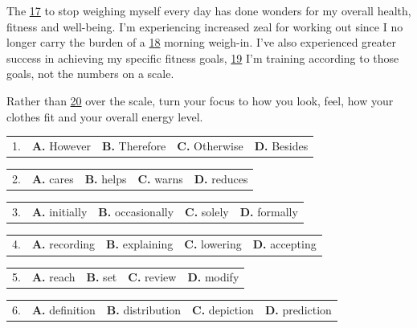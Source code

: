 \documentclass[UTF8,11pt]{ctexart}
\begin{document}
The \uline{17} to stop weighing myself every day has done wonders for my overall health, fitness and well-being. I'm experiencing increased zeal for working out since I no longer carry the burden of a \uline{18} morning weigh-in. I've also experienced greater success in achieving my specific fitness goals, \uline{19} I'm training according to those goals, not the numbers on a scale.


Rather than \uline{20} over the scale, turn your focus to how you look, feel, how your clothes fit and your overall energy level.


\noindent\begin{tabularx}{\linewidth}{@{}lXXXX@{}}1. & \textbf{A.} However & \textbf{B.} Therefore & \textbf{C.} Otherwise & \textbf{D.} Besides\\\end{tabularx}\par

\noindent\begin{tabularx}{\linewidth}{@{}lXXXX@{}}2. & \textbf{A.} cares & \textbf{B.} helps & \textbf{C.} warns & \textbf{D.} reduces\\\end{tabularx}\par

\noindent\begin{tabularx}{\linewidth}{@{}lXXXX@{}}3. & \textbf{A.} initially & \textbf{B.} occasionally & \textbf{C.} solely & \textbf{D.} formally\\\end{tabularx}\par

\noindent\begin{tabularx}{\linewidth}{@{}lXXXX@{}}4. & \textbf{A.} recording & \textbf{B.} explaining & \textbf{C.} lowering & \textbf{D.} accepting\\\end{tabularx}\par

\noindent\begin{tabularx}{\linewidth}{@{}lXXXX@{}}5. & \textbf{A.} reach & \textbf{B.} set & \textbf{C.} review & \textbf{D.} modify\\\end{tabularx}\par

\noindent\begin{tabularx}{\linewidth}{@{}lXXXX@{}}6. & \textbf{A.} definition & \textbf{B.} distribution & \textbf{C.} depiction & \textbf{D.} prediction\\\end{tabularx}\par
\end{document}
